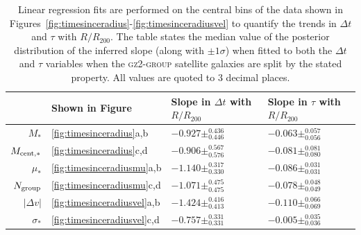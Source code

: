 \documentclass[useAMS,usenatbib]{mn2e}
\begin{document}
\begin{table}

\centering
\caption{Linear regression fits are performed on the central bins of the data shown in Figures~\ref{fig:timesinceradius}-\ref{fig:timesinceradiusvel} to quantify the trends in $\Delta t$ and $\tau$ with $R/R_{200}$. The table states the median value of the posterior distribution of the inferred slope (along with $\pm1\sigma$) when fitted to both the $\Delta t$ and $\tau$ variables when the \textsc{gz2-group} satellite galaxies are split by the stated property. All values are quoted to 3 decimal places.}
\label{table:resultsum}
%
%
%
\setlength\extrarowheight{3pt}
\begin{tabularx}{\textwidth}{r|C|C|C}

\hline
{} & Shown in Figure & Slope in $\Delta t$ with $R/R_{200}$        & Slope in $\tau$ with $R/R_{200}$            \\ \hline 
$M_*$                 & \ref{fig:timesinceradius}a,b          & $-0.927\pm_{0.446}^{0.436}$ & $-0.063\pm_{0.056}^{0.057}$ \\
$M_{\rm{cent},*}$     & \ref{fig:timesinceradius}c,d          & $-0.906\pm_{0.576}^{0.567}$ & $-0.081\pm_{0.080}^{0.081}$ \\
$\mu_*$               & \ref{fig:timesinceradiusmu}a,b         & $-1.140\pm_{0.330}^{0.317}$ & $-0.086\pm_{0.031}^{0.031}$ \\
$N_{\rm{group}}$      & \ref{fig:timesinceradiusmu}c,d         & $-1.071\pm_{0.475}^{0.475}$ & $-0.078\pm_{0.049}^{0.048}$ \\
$|\Delta v|$          & \ref{fig:timesinceradiusvel}a,b         & $-1.424\pm_{0.413}^{0.416}$ & $-0.110\pm_{0.069}^{0.066}$ \\
$\sigma_*$            & \ref{fig:timesinceradiusvel}c,d         & $-0.757\pm_{0.331}^{0.331}$ & $-0.005\pm_{0.036}^{0.035}$ \\ \hline
\end{tabularx}
\end{table}
\end{document}
